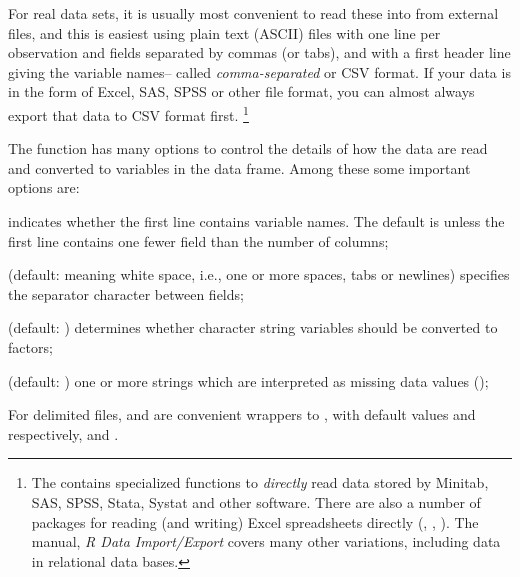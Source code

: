 \documentclass[11pt]{book}\usepackage[]{graphicx}\usepackage[]{color}
\begin{document}
For real data sets, it is usually most convenient to read these into \R
from external files, and this is easiest using plain text (ASCII) files
with one line per observation and fields separated by commas (or tabs),
and with a first header line giving the variable names-- called
\emph{comma-separated} or CSV format.
If your data is in the form of Excel, SAS, SPSS or other file format,
you can almost always export that data to CSV format first.%
\footnote{
The  contains specialized functions to \emph{directly} read
data stored by Minitab, SAS, SPSS, Stata, Systat and other software.
There are also a number of packages for reading (and writing)
Excel spreadsheets directly (, , ).
The \R manual, \emph{R Data Import/Export} covers many other variations,
including data in relational data bases.
}

The function  has many options to control the details
of how the data are read and converted to variables in the data frame.
Among these some important options are:
\begin{description*}
  \item [\code{header}] indicates whether the first line contains
variable names. The default is  unless the first line contains one fewer field
than the number of columns;
  \item[\code{sep}] (default:  meaning white space, i.e., one or more spaces, tabs or newlines) specifies the separator character between fields;
  \item[\code{stringsAsFactors}] (default: ) determines whether character string variables should be converted to factors;
  \item[\code{na.strings}] (default: ) one or more strings which are interpreted
  as missing data values ();
\end{description*}
For delimited files,  and  are convenient wrappers
to , with default values  and 
respectively, and
. 
\end{document}
